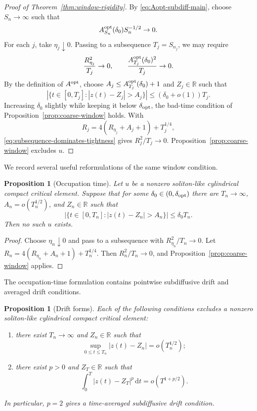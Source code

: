 \documentclass[preprint,12pt]{elsarticle}
\numberwithin{equation}{section}
\newcommand{\R}{\mathbb R}
\newcommand{\dd}{\,\mathrm d}
\newcommand{\Aopt}{A^{\rm opt}}
\newtheorem{proposition}[theorem]{Proposition}
\theoremstyle{remark}
\begin{document}
\begin{proof}[Proof of Theorem~\ref{thm:window-rigidity}]
By \eqref{eq:Aopt-subdiff-main}, choose $S_n\to\infty$ such that
\begin{equation}\label{eq:Aopt-seq-small}
  \Aopt_{S_n}(\delta_0)S_n^{-1/2}\to0.
\end{equation}
For each $j$, take $\eta_j\downarrow0$.  Passing to a subsequence $T_j=S_{n_j}$, we may require
\begin{equation}\label{eq:subsequence-dominates-tightness}
  \frac{R_{\eta_j}^2}{T_j}\to0,
  \qquad
  \frac{\Aopt_{T_j}(\delta_0)^2}{T_j}\to0.
\end{equation}
By the definition of $\Aopt$, choose $A_j\le \Aopt_{T_j}(\delta_0)+1$ and $Z_j\in\R$ such that
\[
  \left|\{t\in[0,T_j]: |z(t)-Z_j|>A_j\}\right|\le(\delta_0+o(1))T_j.
\]
Increasing $\delta_0$ slightly while keeping it below $\delta_{\rm opt}$, the bad-time condition of Proposition~\ref{prop:coarse-window} holds.  With
\[
  R_j=4(R_{\eta_j}+A_j+1)+T_j^{1/4},
\]
\eqref{eq:subsequence-dominates-tightness} gives $R_j^2/T_j\to0$.  Proposition~\ref{prop:coarse-window} excludes $u$.
\end{proof}

We record several useful reformulations of the same window condition.

\begin{proposition}[Occupation time]\label{prop:occupation-window}
Let $u$ be a nonzero soliton-like cylindrical compact critical element.  Suppose that for some $\delta_0\in(0,\delta_{\rm opt})$ there are $T_n\to\infty$, $A_n=o(T_n^{1/2})$, and $Z_n\in\R$ such that
\[
  |\{t\in[0,T_n]: |z(t)-Z_n|>A_n\}|\le\delta_0T_n.
\]
Then no such $u$ exists.
\end{proposition}

\begin{proof}
Choose $\eta_n\downarrow0$ and pass to a subsequence with $R_{\eta_n}^2/T_n\to0$.  Let $R_n=4(R_{\eta_n}+A_n+1)+T_n^{1/4}$.  Then $R_n^2/T_n\to0$, and Proposition~\ref{prop:coarse-window} applies.
\end{proof}

The occupation-time formulation contains pointwise subdiffusive drift and averaged drift conditions.

\begin{proposition}[Drift forms]\label{prop:drift-criteria}
Each of the following conditions excludes a nonzero soliton-like cylindrical compact critical element:
\begin{enumerate}[label=\textup{(\alph*)}]
\item there exist $T_n\to\infty$ and $Z_n\in\R$ such that
\[
  \sup_{0\le t\le T_n}|z(t)-Z_n|=o(T_n^{1/2});
\]
\item there exist $p>0$ and $Z_T\in\R$ such that
\begin{equation}\label{eq:Lp-drift-condition}
  \int_0^T |z(t)-Z_T|^p\dd t=o(T^{1+p/2}).
\end{equation}
\end{enumerate}
In particular, $p=2$ gives a time-averaged subdiffusive drift condition.
\end{proposition}
\end{document}
